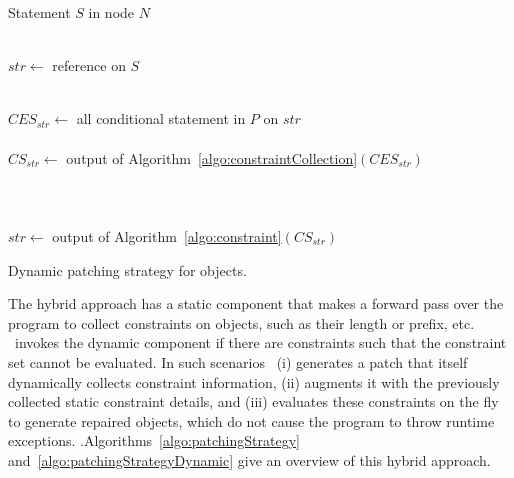 \begin{algorithm}[t]
\scriptsize
\DontPrintSemicolon
{}
\Begin
{
  {
  Statement $S$ in node $N$\\
   {\\
  	\mytab $str \longleftarrow$  reference on $S$
  	
  	 {\\
          \mytab $CES_{str} \longleftarrow$ all conditional statement in $P$ on
$str$\\
 
 \mytab  {}\\
  	  \mytab $CS_{str} \longleftarrow$ output of
Algorithm~\ref{algo:constraintCollection}$(CES_{str})$\\

  		\mytab {} {\\
  		
  		\mytab \mytab {} {\\

\mytab\mytab {}\\
                        \mytab \mytab \mytab $str \longleftarrow$ output of
Algorithm~\ref{algo:constraint}$(CS_{str})$
  		} \mytab \mytab {}
  		}
		\vspace{-4em} 
    }
  }
 }
}

\caption{Dynamic patching strategy for  objects.}
\label{algo:patchingStrategyDynamic}
\end{algorithm}
The hybrid approach has a static component that makes a forward pass over the
program to collect constraints on  objects, such as their
length or prefix, etc. \tool\ invokes the dynamic component if there are constraints
such that the constraint set cannot be evaluated. In
such scenarios \tool\ (i) generates a patch that itself dynamically collects
constraint information, (ii) augments it with the previously collected static
constraint details, and (iii) evaluates these constraints on the fly to generate
repaired  objects, which do not cause the program to throw runtime
exceptions. .Algorithms~\ref{algo:patchingStrategy}
and~\ref{algo:patchingStrategyDynamic} give an overview of this hybrid approach.

